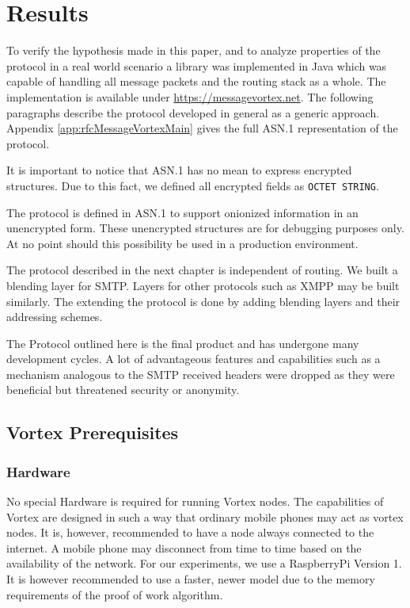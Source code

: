 
\part{Results}
To verify the hypothesis made in this paper, and to analyze properties of the protocol in a real world scenario a library was implemented in Java which was capable of handling all message packets and the routing stack as a whole. The implementation is available under \url{https://messagevortex.net}. The following paragraphs describe the protocol developed in general as a generic approach. Appendix \ref{app:rfcMessageVortexMain} gives the full ASN.1 representation of the protocol. 

It is important to notice that ASN.1 has no mean to express encrypted structures. Due to this fact, we defined all encrypted fields as \verb|OCTET STRING|. 

The protocol is defined in ASN.1 to support onionized information in an unencrypted form. These unencrypted structures are for debugging purposes only. At no point should this possibility be used in a production environment.

The protocol described in the next chapter is independent of routing. We built a blending layer for SMTP. Layers for other protocols such as XMPP may be built similarly. The extending the protocol is done by adding blending layers and their addressing schemes.

The Protocol outlined here is the final product and has undergone many development cycles. A lot of advantageous features and capabilities such as a mechanism analogous to the SMTP received headers were dropped as they were beneficial but threatened security or anonymity.

\chapter{Vortex Prerequisites}
\section{Hardware}
No special Hardware is required for running Vortex nodes. The capabilities of Vortex are designed in such a way that ordinary mobile phones may act as vortex nodes. It is, however, recommended to have a node always connected to the internet. A mobile phone may disconnect from time to time based on the availability of the network. For our experiments, we use a RaspberryPi Version 1. It is however recommended to use a faster, newer model due to the memory requirements of the proof of work algorithm.

